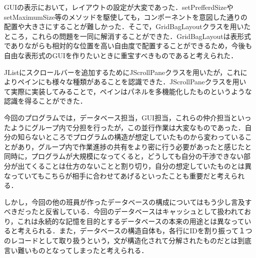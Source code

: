 \documentclass[12pt]{jarticle}
\begin{document}
GUIの表示において，レイアウトの設定が大変であった．setPrefferdSizeやsetMaximumSize等のメソッドを駆使しても，コンポーネントを意図した通りの配置や大きさにすることが難しかった．そこで，GridBagLayoutクラスを用いたところ，これらの問題を一同に解消することができた．GridBagLayoutは表形式でありながらも相対的な位置を高い自由度で配置することができるため，今後も自由な表形式のGUIを作りたいときに重宝すべきものであると考えられた．

JListにスクロールバーを追加するためにJScrollPaneクラスを用いたが，これによりペインにも様々な種類があることを認識できた．JScrollPaneクラスを用いて実際に実装してみることで，ペインはパネルを多機能化したものというような認識を得ることができた．

今回のプログラムでは，データベース担当，GUI担当，これらの仲介担当といったようにグループ内で分担を行ったが，この並行作業は大変なものであった．自分の知らないところでプログラムの構造が想定していたものから変わっていることがあり，グループ内で作業進捗の共有をより密に行う必要があったと感じたと同時に，プログラムが大規模になってくると，どうしても自分の干渉できない部分が出てくることは仕方のないことと割り切り，自分の想定していたものとは異なっていてもこちらが相手に合わせてあげるといったことも重要だと考えられる．

しかし，今回の他の班員が作ったデータベースの構成についてはもう少し言及すべきだったと反省している．今回のデータベースはキャッシュとして扱われており，これは永続的な記憶を目的とするデータベースの本来の用途とは異なっていると考えられる．また，データベースの構造自体も，各行にIDを割り振って１つのレコードとして取り扱うという，文が構造化されて分解されたものだとは到底言い難いものとなってしまったと考えられる．
\end{document}
